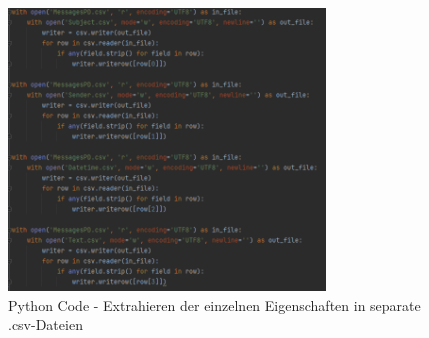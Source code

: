 \begin{figure}[!ht]
    \centering
    \includegraphics[width=0.75\textwidth]{images/Einzelne_Eigenschaften_in_CSV.PNG}
    \caption{Python Code - Extrahieren der einzelnen Eigenschaften in separate .csv-Dateien} 
    \label{fig:csvseparation}
\end{figure}

\newpage